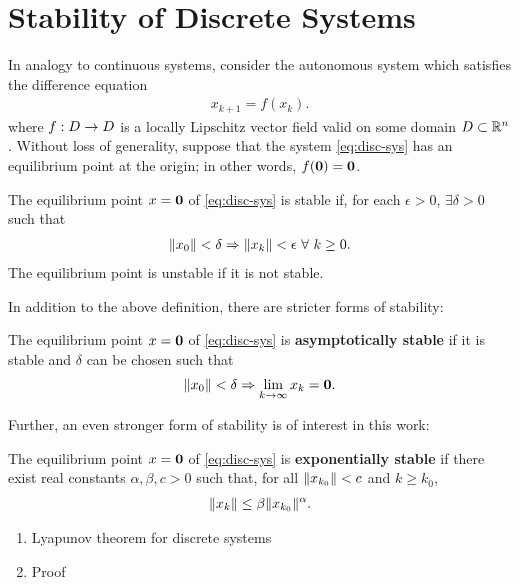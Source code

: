 \section{Stability of Discrete Systems}

In analogy to continuous systems, consider the autonomous system which satisfies
the difference equation
\begin{align}
  \label{eq:disc-sys}
  x_{k+1} = f(x_{k}).
\end{align}
where $f : D \to D$ is a locally Lipschitz vector field valid on some domain
$D \subset \mathbb{R}^{n}$.
%
Without loss of generality, suppose that the system \eqref{eq:disc-sys} has an
equilibrium point at the origin;
%
in other words, $f({\mathbf 0}) = {\mathbf 0}$.
%
\begin{definition}
  The equilibrium point $x = {\mathbf 0}$ of \eqref{eq:disc-sys} is stable if, for each $\epsilon > 0$,
  $\exists \delta > 0$ such that
  \begin{align*}
    \|x_{0}\| < \delta \Rightarrow \|x_{k}\| < \epsilon \ \forall \ k
    \geq 0.
  \end{align*}
  The equilibrium point is unstable if it is not stable.
\end{definition}

In addition to the above definition, there are stricter forms of stability:
\begin{definition}
  The equilibrium point $x = {\mathbf 0}$ of \eqref{eq:disc-sys} is {\bf asymptotically stable} if it is
  stable and $\delta$ can be chosen such that
  \begin{align*}
    \|x_{0}\| < \delta \Rightarrow \lim_{k \to \infty} x_{k} = {\mathbf 0}.
  \end{align*}
\end{definition}

Further, an even stronger form of stability is of interest in this work:
\begin{definition}
  The equilibrium point $x = {\mathbf 0}$ of \eqref{eq:disc-sys} is {\bf
    exponentially stable} if there exist real constants $\alpha, \beta, c> 0$
  such that, for all $\|x_{k_{0}}\| < c$ and $k \geq k_{0}$,
  \begin{align*}
    \|x_{k}\| \leq \beta \|x_{k_{0}}\|^{\alpha}.
  \end{align*}
\end{definition}



\begin{enumerate}
\item Lyapunov theorem for discrete systems
\item Proof
\end{enumerate}